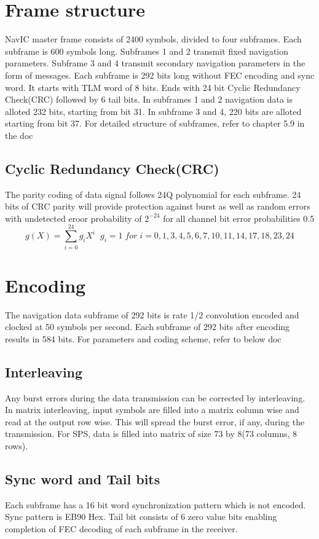 \section{Frame structure}
NavIC master frame consists of 2400 symbols, divided to four subframes. Each subframe is 600 symbols long. Subframes 1 and 2 transmit fixed navigation parameters. Subframe 3 and 4 transmit secondary navigation parameters in the form of messages. Each subframe is 292 bits long without FEC encoding and sync word. It starts with TLM word of 8 bits. Ends with 24 bit Cyclic Redundancy Check(CRC) followed by 6 tail bits. In subframes 1 and 2 navigation data is alloted 232 bits, starting from bit 31. In subframe 3 and 4, 220 bits are alloted starting from bit 37. For detailed structure of subframes, refer to chapter 5.9 in the doc
\subsection{Cyclic Redundancy Check(CRC)}
The parity coding of data signal follows 24Q polynomial for each subframe. 24 bits of CRC parity will provide protection against burst as well as random errors with undetected eroor probability of $2^{-24}$ for all channel bit error probabilities 0.5
\begin{equation}
    g(X) = \sum_{i = 0}^{24}g_{i}X^i\;\;
    g_{i}=1\; for\; i = 0,1,3,4,5,6,7,10,11,14,17,18,23,24
\end{equation}
\section{Encoding}
The navigation data subframe of 292 bits is rate 1/2 convolution encoded and clocked at 50 symbols per second. Each subframe of 292 bits after encoding results in 584 bits. For parameters and coding scheme, refer to below doc
\subsection{Interleaving}
Any burst errors during the data transmission can be corrected by interleaving. In matrix interleaving, input symbols are filled into a matrix column wise and read at the output row wise. This will spread the burst error, if any, during the transmission. For SPS, data is filled into matrix of size 73 by 8(73 columns, 8 rows).
\subsection{Sync word and Tail bits}
Each subframe has a 16 bit word synchronization pattern which is not encoded. Sync pattern is EB90 Hex. Tail bit consists of 6 zero value bits enabling completion of FEC decoding of each subframe in the receiver.


